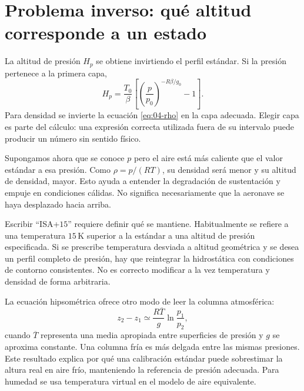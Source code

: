 \section{Problema inverso: qué altitud corresponde a un estado}
La altitud de presión $H_p$ se obtiene invirtiendo el perfil estándar. Si la presión pertenece a la primera capa,
\begin{equation}\label{eq:04-inv}
 H_p=\frac{T_0}{\beta}\left[\left(\frac{p}{p_0}\right)^{-R\beta/g_0}-1\right].
\end{equation}
Para densidad se invierte la ecuación \eqref{eq:04-rho} en la capa adecuada. Elegir capa es parte del cálculo: una expresión correcta utilizada fuera de su intervalo puede producir un número sin sentido físico.

Supongamos ahora que se conoce $p$ pero el aire está más caliente que el valor estándar a esa presión. Como $\rho=p/(RT)$, su densidad será menor y su altitud de densidad, mayor. Esto ayuda a entender la degradación de sustentación y empuje en condiciones cálidas. No significa necesariamente que la aeronave se haya desplazado hacia arriba.

Escribir ``ISA+$15$'' requiere definir qué se mantiene. Habitualmente se refiere a una temperatura $15\,\mathrm{K}$ superior a la estándar a una altitud de presión especificada. Si se prescribe temperatura desviada a altitud geométrica y se desea un perfil completo de presión, hay que reintegrar la hidrostática con condiciones de contorno consistentes. No es correcto modificar a la vez temperatura y densidad de forma arbitraria.

La ecuación hipsométrica ofrece otro modo de leer la columna atmosférica:
\begin{equation}
 z_2-z_1\simeq\frac{R\overline{T}}{g}\ln\frac{p_1}{p_2},
\end{equation}
cuando $\overline{T}$ representa una media apropiada entre superficies de presión y $g$ se aproxima constante. Una columna fría es más delgada entre las mismas presiones. Este resultado explica por qué una calibración estándar puede sobrestimar la altura real en aire frío, manteniendo la referencia de presión adecuada. Para humedad se usa temperatura virtual en el modelo de aire equivalente.

